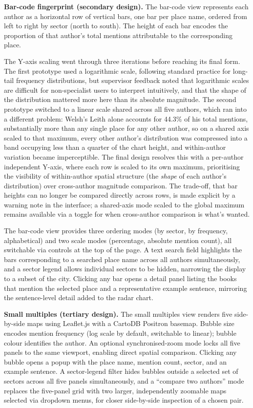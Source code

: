\documentclass[logo,msc]{infthesis}
\begin{document}
\textbf{Bar-code fingerprint (secondary design).} The bar-code view represents each author as a horizontal row of vertical bars, one bar per place name, ordered from left to right by sector (north to south). The height of each bar encodes the proportion of that author's total mentions attributable to the corresponding place.
 
The Y-axis scaling went through three iterations before reaching its final form. The first prototype used a logarithmic scale, following standard practice for long-tail frequency distributions, but supervisor feedback noted that logarithmic scales are difficult for non-specialist users to interpret intuitively, and that the shape of the distribution mattered more here than its absolute magnitude. The second prototype switched to a linear scale shared across all five authors, which ran into a different problem: Welsh's Leith alone accounts for 44.3\% of his total mentions, substantially more than any single place for any other author, so on a shared axis scaled to that maximum, every other author's distribution was compressed into a band occupying less than a quarter of the chart height, and within-author variation became imperceptible. The final design resolves this with a per-author independent Y-axis, where each row is scaled to its own maximum, prioritising the visibility of within-author spatial structure (the \emph{shape} of each author's distribution) over cross-author magnitude comparison. The trade-off, that bar heights can no longer be compared directly across rows, is made explicit by a warning note in the interface; a shared-axis mode scaled to the global maximum remains available via a toggle for when cross-author comparison is what's wanted.
 
The bar-code view provides three ordering modes (by sector, by frequency, alphabetical) and two scale modes (percentage, absolute mention count), all switchable via controls at the top of the page. A text search field highlights the bars corresponding to a searched place name across all authors simultaneously, and a sector legend allows individual sectors to be hidden, narrowing the display to a subset of the city. Clicking any bar opens a detail panel listing the books that mention the selected place and a representative example sentence, mirroring the sentence-level detail added to the radar chart.
 
\textbf{Small multiples (tertiary design).} The small multiples view renders five side-by-side maps using Leaflet.js with a CartoDB Positron basemap. Bubble size encodes mention frequency (log scale by default, switchable to linear); bubble colour identifies the author. An optional synchronised-zoom mode locks all five panels to the same viewport, enabling direct spatial comparison. Clicking any bubble opens a popup with the place name, mention count, sector, and an example sentence. A sector-legend filter hides bubbles outside a selected set of sectors across all five panels simultaneously, and a ``compare two authors'' mode replaces the five-panel grid with two larger, independently zoomable maps selected via dropdown menus, for closer side-by-side inspection of a chosen pair.
 
\end{document}
